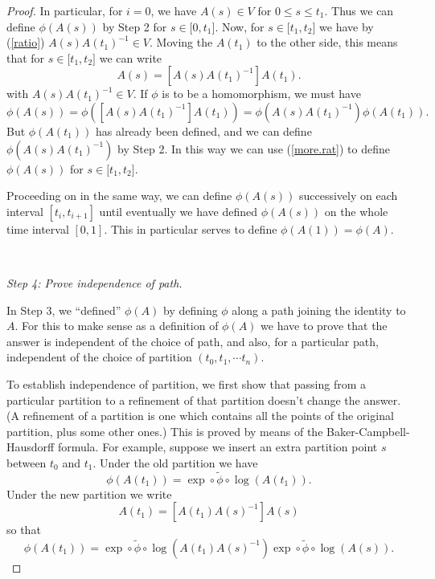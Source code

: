 \documentclass{amsbook}
\theoremstyle{plain}
\numberwithin{equation}{chapter}
\numberwithin{theorem}{chapter}
\begin{document}
\begin{proof}
In particular, for $i=0$, we have $A(s)\in V$ for $0\leq s\leq t_{1}$. Thus we
can define $\phi\left(  A(s)\right)  $ by Step 2 for $s\in\lbrack0,t_{1}]$.
Now, for $s\in\lbrack t_{1},t_{2}]$ we have by (\ref{ratio}) $A(s)A(t_{1}%
)^{-1}\in V$. Moving the $A(t_{1})$ to the other side, this means that for
$s\in\lbrack t_{1},t_{2}]$ we can write
\[
A(s)=\left[  A(s)A(t_{1})^{-1}\right]  A(t_{1})\text{.}%
\]
with $A(s)A(t_{1})^{-1}\in V$. If $\phi$ is to be a homomorphism, we must
have
\begin{equation}
\phi\left(  A(s)\right)  =\phi\left(  \left[  A(s)A(t_{1})^{-1}\right]
A(t_{1})\right)  =\phi\left(  A(s)A(t_{1})^{-1}\right)  \phi\left(
A(t_{1})\right)  \text{.}\label{more.rat}%
\end{equation}
But $\phi\left(  A(t_{1})\right)  $ has already been defined, and we can
define $\phi\left(  A(s)A(t_{1})^{-1}\right)  $ by Step 2. In this way we can
use (\ref{more.rat}) to define $\phi\left(  A(s)\right)  $ for $s\in\lbrack
t_{1},t_{2}]$.

Proceeding on in the same way, we can define $\phi\left(  A(s)\right)  $
successively on each interval $[t_{i},t_{i+1}]$ until eventually we have
defined $\phi\left(  A(s)\right)  $ on the whole time interval $[0,1]$. This
in particular serves to define $\phi\left(  A(1)\right)  =\phi(A)$.

\ 

\textit{Step 4: Prove independence of path.}

In Step 3, we ``defined'' $\phi(A)$ by defining $\phi$ along a path joining
the identity to $A$. For this to make sense as a definition of $\phi(A)$ we
have to prove that the answer is independent of the choice of path, and also,
for a particular path, independent of the choice of partition $(t_{0}%
,t_{1},\cdots t_{n})$.

To establish independence of partition, we first show that passing from a
particular partition to a refinement of that partition doesn't change the
answer. (A refinement of a partition is one which contains all the points of
the original partition, plus some other ones.) This is proved by means of the
Baker-Campbell-Hausdorff formula. For example, suppose we insert an extra
partition point $s$ between $t_{0}$ and $t_{1}$. Under the old partition we
have
\begin{equation}
\phi\left(  A(t_{1})\right)  =\exp\circ\widetilde{\phi}\circ\log\left(
A(t_{1})\right)  \text{.}\label{old}%
\end{equation}
Under the new partition we write
\[
A(t_{1})=\left[  A(t_{1})A(s)^{-1}\right]  A(s)
\]
so that
\begin{equation}
\phi\left(  A(t_{1})\right)  =\exp\circ\widetilde{\phi}\circ\log\left(
A(t_{1})A(s)^{-1}\right)  \exp\circ\widetilde{\phi}\circ\log\left(
A(s)\right)  \text{.}\label{new}%
\end{equation}


\end{proof}
\end{document}
